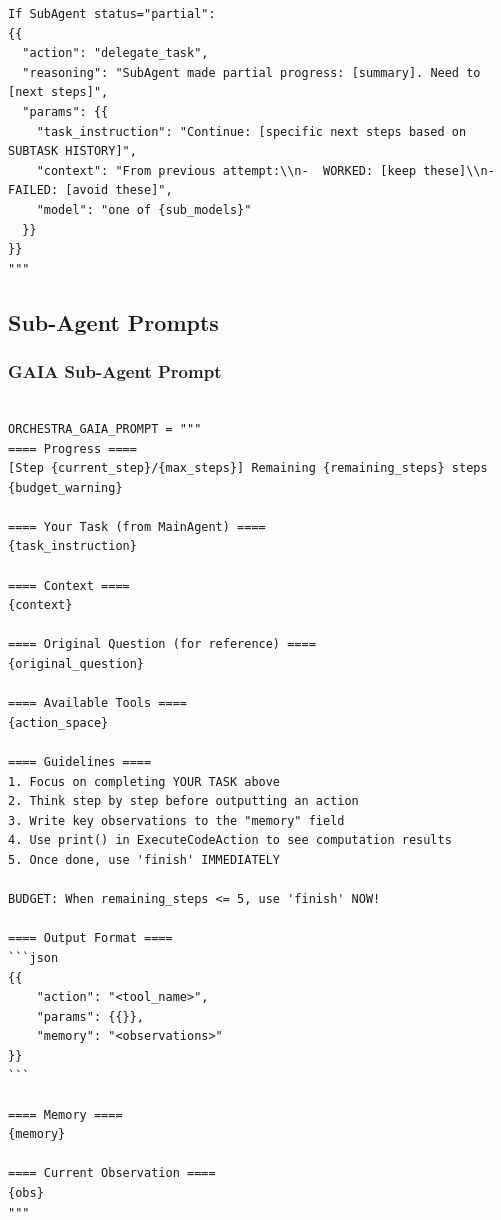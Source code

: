 \begin{tcolorbox}
\begin{verbatim}
If SubAgent status="partial":
{{
  "action": "delegate_task",
  "reasoning": "SubAgent made partial progress: [summary]. Need to [next steps]",
  "params": {{
    "task_instruction": "Continue: [specific next steps based on SUBTASK HISTORY]",
    "context": "From previous attempt:\\n-  WORKED: [keep these]\\n-  FAILED: [avoid these]",
    "model": "one of {sub_models}"
  }}
}}
"""
\end{verbatim}
\end{tcolorbox}



\subsection{Sub-Agent Prompts}
\label{app:B2}

\subsubsection{GAIA Sub-Agent Prompt}
\label{app:B2_gaia}

\begin{tcolorbox}[title={\textbf{\small Gaia Sub-Agent Prompt }},   boxrule=1pt, arc=0mm,colback=black!5!white,colframe=darkgray,breakable, before skip=10pt, after skip=10pt,pad at break=2mm, parbox=false]
\begin{verbatim}

ORCHESTRA_GAIA_PROMPT = """
==== Progress ====
[Step {current_step}/{max_steps}] Remaining {remaining_steps} steps
{budget_warning}

==== Your Task (from MainAgent) ====
{task_instruction}

==== Context ====
{context}

==== Original Question (for reference) ====
{original_question}

==== Available Tools ====
{action_space}

==== Guidelines ====
1. Focus on completing YOUR TASK above
2. Think step by step before outputting an action
3. Write key observations to the "memory" field
4. Use print() in ExecuteCodeAction to see computation results
5. Once done, use 'finish' IMMEDIATELY

BUDGET: When remaining_steps <= 5, use 'finish' NOW!

==== Output Format ====
```json
{{
    "action": "<tool_name>",
    "params": {{}},
    "memory": "<observations>"
}}
```

==== Memory ====
{memory}

==== Current Observation ====
{obs}
"""

\end{verbatim}
\end{tcolorbox}

